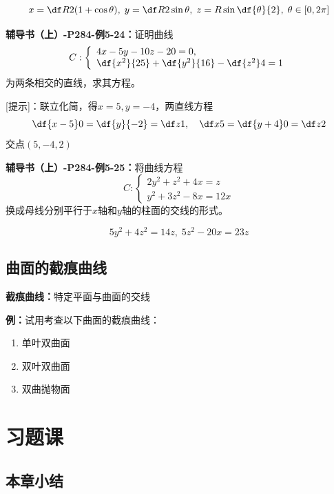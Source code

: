 $${x=\df R2(1+\cos\theta),\;y=\df
R2\sin\theta,\;z=R\sin\df{\theta}{2},\;\theta\in[0,2\pi]}$$

{\bf 辅导书（上）-P284-例5-24：}证明曲线$$C:\left\{\begin{array}{l}
	4x-5y-10z-20=0,\\ \df{x^2}{25}+\df{y^2}{16}-\df{z^2}4=1
\end{array}\right.$$
为两条相交的直线，求其方程。

[提示]：联立化简，得$x=5,y=-4$，两直线方程
$$\df{x-5}0=\df{y}{-2}=\df z1,\quad \df x5=\df{y+4}0=\df z2$$
交点$(5,-4,2)$

{\bf 辅导书（上）-P284-例5-25：}将曲线方程$$C:\left\{\begin{array}{l}
	2y^2+z^2+4x=z\\ y^2+3z^2-8x=12x
\end{array}\right.$$
换成母线分别平行于$x$轴和$y$轴的柱面的交线的形式。

$$5y^2+4z^2=14z,\;5z^2-20x=23z$$
\subsection{曲面的截痕曲线}

{\bf 截痕曲线：}特定平面与曲面的交线

{\bf 例：}试用考查以下曲面的截痕曲线：
\begin{enumerate}[(1)]
  \setlength{\itemindent}{1cm}
  \item 单叶双曲面
  \item 双叶双曲面
  \item 双曲抛物面
\end{enumerate}

\section{习题课}

\subsection{本章小结}

